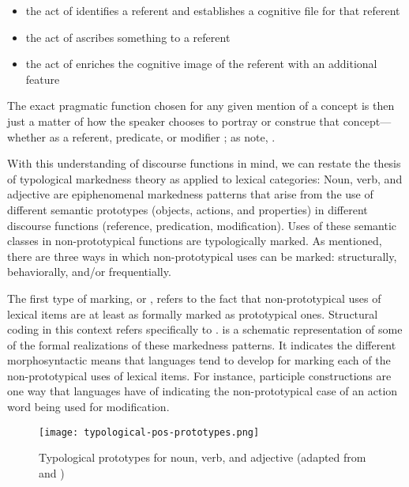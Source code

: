 \begin{itemize}
  \item the act of  identifies a referent and establishes a cognitive file for that referent
  \item the act of  ascribes something to a referent
  \item the act of  enriches the cognitive image of the referent with an additional feature
\end{itemize}

\noindent The exact pragmatic function chosen for any given mention of a concept is then just a matter of how the speaker chooses to portray or construe that concept—whether as a referent, predicate, or modifier \parencite[100]{Croft1991}; as \citeauthor{CroftLier2012} note, .

With this understanding of discourse functions in mind, we can restate the thesis of typological markedness theory as applied to lexical categories: Noun, verb, and adjective are epiphenomenal markedness patterns that arise from the use of different semantic prototypes (objects, actions, and properties) in different discourse functions (reference, predication, modification). Uses of these semantic classes in non-prototypical functions are typologically marked. As mentioned, there are three ways in which non-prototypical uses can be marked: structurally, behaviorally, and/or frequentially.

The first type of marking,  or , refers to the fact that non-prototypical uses of lexical items are at least as formally marked as prototypical ones. Structural coding in this context refers specifically to .  is a schematic representation of some of the formal realizations of these markedness patterns. It indicates the different morphosyntactic means that languages tend to develop for marking each of the non-prototypical uses of lexical items. For instance, participle constructions are one way that languages have of indicating the non-prototypical case of an action word being used for modification.

\begin{figure}[h!]
  \centering
  \texttt{[image: typological-pos-prototypes.png]}
  \caption[Typological prototypes for noun, verb, and adjective]{Typological prototypes for noun, verb, and adjective (adapted from \textcite[89]{Croft2000} and \textcite[62]{Lier2012})}
  \label{fig:typological-pos-prototypes}
\end{figure}

